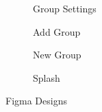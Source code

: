     \begin{figure}
    \ContinuedFloat
    \centering
    \noindent\begin{subfigure}[b]{0.23\textwidth}
        \centering
        \caption{Group Settings}
    \end{subfigure}
    \hspace{0.5em}
    \noindent\begin{subfigure}[b]{0.23\textwidth}
        \centering
        \caption{Add Group}
    \end{subfigure}
    \hspace{0.5em}
    \noindent\begin{subfigure}[b]{0.23\textwidth}
        \centering
        \caption{New Group }
    \end{subfigure}
    \hspace{0.5em}
    \noindent\begin{subfigure}[b]{0.23\textwidth}
        \centering
        \caption{Splash}\label{splash}
    \end{subfigure}
    \caption{Figma Designs}
\end{figure}
\FloatBarrier



